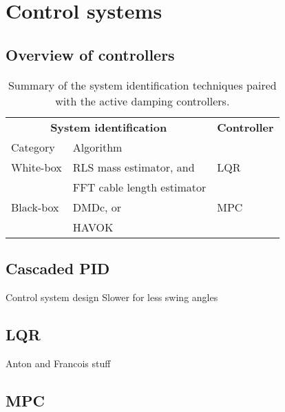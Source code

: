 \graphicspath{{control/fig/}}

\chapter{Control systems}
\label{chap:control}

    \FloatBarrier\section{Overview of controllers} \label{sec:controller_overview}

        \begin{table}[!h]
            \renewcommand{\arraystretch}{1.1}
            \centering
            \caption{Summary of the system identification techniques paired with the active damping controllers.}
            \begin{tabularx}{0.75\linewidth}{@{}lll@{}}
                \toprule
                \multicolumn{2}{c}{\textbf{System identification}}   & \textbf{Controller} \\
                \cmidrule(lr){1-2}
                Category    & Algorithm                     & \\
                \midrule
                White-box   & RLS mass estimator, and       & LQR \\
                            & FFT cable length estimator    & \\
                Black-box   & DMDc, or                      & MPC \\
                            & HAVOK                         & \\
                \bottomrule
            \end{tabularx}
            \label{tbl:controller_summary}
        \end{table}
    

    \FloatBarrier\section{Cascaded PID}

        Control system design
        Slower for less swing angles

    \FloatBarrier\section{LQR}

        Anton and Francois stuff

    \FloatBarrier\section{MPC} \label{sec:mpc}

